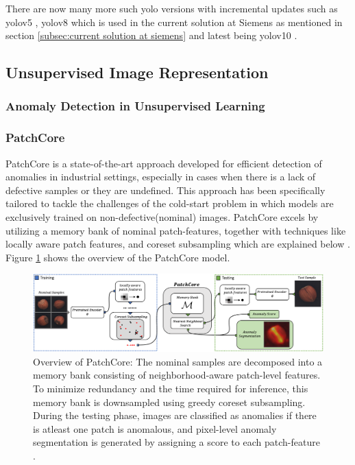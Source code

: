 There are now many more such \gls{yolo} versions with incremental updates such as \gls{yolo}v5 \cite{yolov5}, \gls{yolo}v8 \cite{Ultralytics2024} which is used in the current solution at Siemens as mentioned in section \ref{subsec:current solution at siemens} and latest being \gls{yolo}v10 \cite{Ultralytics2024v10}.

\subsection{Unsupervised Image Representation}

\subsubsection{Anomaly Detection in Unsupervised Learning}

\subsubsection{PatchCore}
\label{subsec:patchcore}

PatchCore is a state-of-the-art approach developed for efficient detection of anomalies in industrial settings, especially in cases when there is a lack of defective samples or they are undefined. This approach has been specifically tailored to tackle the challenges of the cold-start problem in which models are exclusively trained on non-defective(nominal) images. PatchCore excels by utilizing a memory bank of nominal patch-features, together with techniques like locally aware patch features, and coreset subsampling which are explained below \cite{roth2022totalrecallindustrialanomaly}. Figure \ref{fig:patchcore architecture} shows the overview of the PatchCore model.

\begin{figure}[ht!]
    \centering
    \includegraphics[width=1.1\textwidth]{Rohit_Master_Thesis//Images/patchcore_architecture_figure.png}
    \caption{Overview of PatchCore: The nominal samples are decomposed into a memory bank consisting of neighborhood-aware patch-level features. To minimize redundancy and the time required for inference, this memory bank is downsampled using greedy coreset subsampling. During the testing phase, images are classified as anomalies if there is atleast one patch is anomalous, and pixel-level anomaly segmentation is generated by assigning a score to each patch-feature \cite{roth2022totalrecallindustrialanomaly}.}
    \label{fig:patchcore architecture}
\end{figure}

